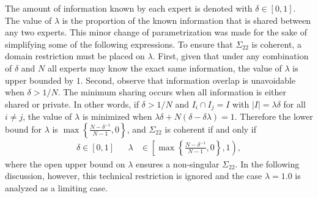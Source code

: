 \documentclass[11pt]{article}
\theoremstyle{definition}
\theoremstyle{definition}
\begin{document}
The amount of information known by each expert is denoted with $\delta \in [0,1]$. The value of $\lambda$ is the proportion of the known information that is shared between any two experts.  This minor change of parametrization was made for the sake of simplifying some of the following expressions. To ensure that $\Sigma_{22}$ is coherent, a domain restriction must be placed on $\lambda$. 
First, given that under any combination of $\delta$ and $N$ all experts may know the exact same information, the value of $\lambda$ is upper bounded by $1$. Second, observe that information overlap is unavoidable when $\delta > 1/N$. The minimum sharing occurs when all information is either shared or private. In other words, if $\delta > 1/N$ and $I_{i} \cap I_j = I$ with $|I| =  \lambda \delta$ for all $i \neq j$, the value of $\lambda$ is minimized when $\lambda\delta + N(\delta - \delta\lambda) = 1$. Therefore the lower bound for $\lambda$ is $\max \left\{ \frac{N-\delta^{-1}}{N-1}, 0\right\}$, and $\Sigma_{22}$ is coherent if and only if
\begin{align}
\delta \in [0,1] &&  \lambda &\in \left[  \max \left\{ \frac{N-\delta^{-1}}{N-1}, 0\right\}, 1 \right), \label{rhoDomain}
\end{align}
where the open upper bound on $\lambda$ ensures a non-singular $\Sigma_{22}$. In the following discussion, however, this technical restriction is ignored and the case $\lambda = 1.0$ is analyzed as a limiting case.

\end{document}

